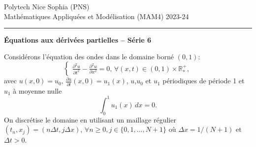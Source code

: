 \documentclass[12pt,a4paper]{article}
\begin{document}
 \hfill Polytech Nice Sophia (PNS)\\
\noindent Math\'ematiques Appliqu\'ees et Mod\'elisation (MAM4)
\hfill 2023-24\\

\hrule

\bigskip
\bigskip

\begin{center}{\bf \'Equations aux d\'eriv\'ees partielles --
S\'erie 6}\end{center}

\bigskip

\parskip 12pt
\noindent Consid\'erons l'\'equation des ondes dans le domaine born\'e $(0,1)$:
$$
\begin{cases}
\displaystyle\frac{\partial^2 u}{\partial t^2}-\frac{\partial^2 u}{\partial
  x^2}=0,\, \forall (x,t)\in(0,1)\times\mathbb{R}^+_*,
\end{cases}
$$
avec $u(x, 0) = u_0,\, \displaystyle\frac{\partial u}{\partial t}(x,0)=u_1(x)$,
$u$,$u_0$ et $u_1$ p\'eriodiques de p\'eriode 1 et $u_1$ \`a moyenne nulle
$$
\int_0^1 u_1(x)\,dx =0.
$$
On discr\'etise le domaine en utilisant un maillage r\'egulier
$(t_n,x_j)=(n\Delta t,j\Delta x)$,  $\forall n\ge 0,
j\in\{0,1,...,N+1\}$ o\`u $\Delta x=1/(N+1)$ et $\Delta t>0$.\\
\end{document}
